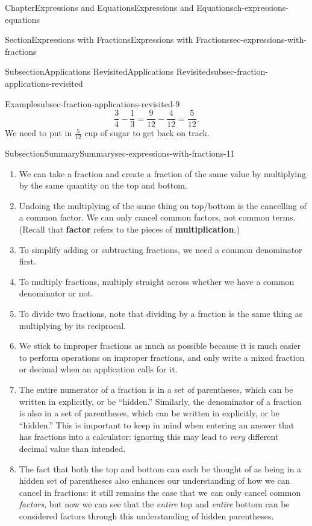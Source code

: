 \documentclass[twoside,11pt,]{book}
\newcommand{\terminology}[1]{\textbf{#1}}
\numberwithin{equation}{chapter}
\begin{document}
\begin{chapterptx}{Chapter}{Expressions and Equations}{}{Expressions and Equations}{}{}{ch-expressions-equations}
\begin{sectionptx}{Section}{Expressions with Fractions}{}{Expressions with Fractions}{}{}{sec-expressions-with-fractions}
\begin{subsectionptx}{Subsection}{Applications Revisited}{}{Applications Revisited}{}{}{subsec-fraction-applications-revisited}
\begin{example}{Example}{}{subsec-fraction-applications-revisited-9}
\begin{equation*}
\frac34 - \frac13 = \frac{9}{12} - \frac{4}{12} = \frac{5}{12}.
\end{equation*}
We need to put in \(\frac{5}{12}\) cup of sugar to get back on track.%
\end{example}
\end{subsectionptx}
%
%
\typeout{************************************************}
\typeout{************************************************}
%
\begin{subsectionptx}{Subsection}{Summary}{}{Summary}{}{}{sec-expressions-with-fractions-11}
%
\begin{enumerate}
\item{}We can take a fraction and create a fraction of the same value by multiplying by the same quantity on the top and bottom.%
\item{}Undoing the multiplying of the same thing on top\slash{}bottom is the cancelling of a common factor. We can only cancel common factors, not common terms. (Recall that \terminology{factor} refers to the pieces of \terminology{multiplication}.)%
\item{}To simplify adding or subtracting fractions, we need a common denominator first.%
\item{}To multiply fractions, multiply straight across whether we have a common denominator or not.%
\item{}To divide two fractions, note that dividing by a fraction is the same thing as multiplying by its reciprocal.%
\item{}We stick to improper fractions as much as possible because it is much easier to perform operations on improper fractions, and only write a mixed fraction or decimal when an application calls for it.%
\item{}The entire numerator of a fraction is in a set of parentheses, which can be written in explicitly, or be ``hidden.'' Similarly, the denominator of a fraction is also in a set of parentheses, which can be written in explicitly, or be ``hidden.'' This is important to keep in mind when entering an answer that has fractions into a calculator: ignoring this may lead to \emph{very} different decimal value than intended.%
\item{}The fact that both the top and bottom can each be thought of as being in a hidden set of parentheses also enhances our understanding of how we can cancel in fractions: it still remains the case that we can only cancel common \emph{factors}, but now we can see that the \emph{entire} top and \emph{entire} bottom can be considered factors through this understanding of hidden parentheses.%

\end{enumerate}
\end{subsectionptx}
\end{sectionptx}
\end{chapterptx}
\end{document}
